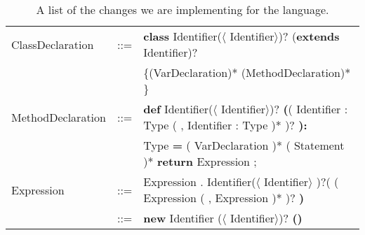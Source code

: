 \begin{table}[h]
  \caption{A list of the changes we are implementing for the language.}
  \begin{tabular}{ l  c  l}
    \hline
    ClassDeclaration & ::= & \textbf{class} Identifier($\langle$ Identifier$\rangle$)?
    (\textbf{extends} Identifier)?  \\
    && \{(VarDeclaration)* (MethodDeclaration)* \}  \\
    \hline
    MethodDeclaration & ::= & \textbf{def} Identifier($\langle$ Identifier$\rangle$)?
    \textbf{(}( Identifier : Type ( , Identifier : Type )* )? \textbf{):}\\
    &&Type \textbf{=}
    { ( VarDeclaration )* ( Statement )*
    \textbf{return} Expression ; }\\
    \hline
    Expression & ::= & Expression . Identifier($\langle$ Identifier$\rangle$ )?( ( Expression ( , Expression )* )? \textbf{)} \\
    & ::= & \textbf{new} Identifier ($\langle$ Identifier$\rangle$)? \textbf{()} \\
    \hline
  \end{tabular}
\end{table}

